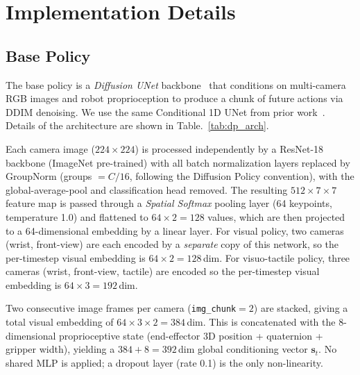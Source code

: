 \section{Implementation Details}
\label{app:implement_details}
\subsection{Base Policy}
\label{app:implement_base_policy}

  The base policy is a \emph{Diffusion UNet} backbone~\cite{chi2024diffusionpolicy}
  that conditions on multi-camera RGB images and robot proprioception to produce a chunk of future
  actions via DDIM denoising. We use the same Conditional 1D UNet from  prior work~\cite{chi2024diffusionpolicy}. Details of the architecture are shown in Table.~\ref{tab:dp_arch}.

  Each camera image ($224\times224$) is processed independently by a
  ResNet-18~\cite{he2016identity} backbone (ImageNet pre-trained) with all batch normalization layers
  replaced by GroupNorm (groups $= C/16$, following the Diffusion Policy convention), with the
  global-average-pool and classification head removed.
  The resulting $512\times7\times7$ feature map is passed through a \emph{Spatial Softmax}
  pooling layer (64 keypoints, temperature 1.0) and flattened to $64\times2=128$ values, which are
  then projected to a 64-dimensional embedding by a linear layer. For visual policy, two cameras (wrist, front-view) are each encoded by a \emph{separate} copy of this
  network, so the per-timestep visual embedding is $64\times2=128$\,dim.
  For visuo-tactile policy, three cameras (wrist, front-view, tactile) are encoded so the per-timestep visual embedding is $64\times3=192$\,dim.

  Two consecutive image frames per camera (\texttt{img\_chunk}$=2$) are stacked, giving a total
  visual embedding of $64\times3\times2=384$\,dim.
  This is concatenated with the 8-dimensional proprioceptive state
  (end-effector 3D position + quaternion + gripper width), yielding a
  $384+8=392$\,dim global conditioning vector $\mathbf{s}_t$.
  No shared MLP is applied; a dropout layer (rate 0.1) is the only non-linearity.

 

